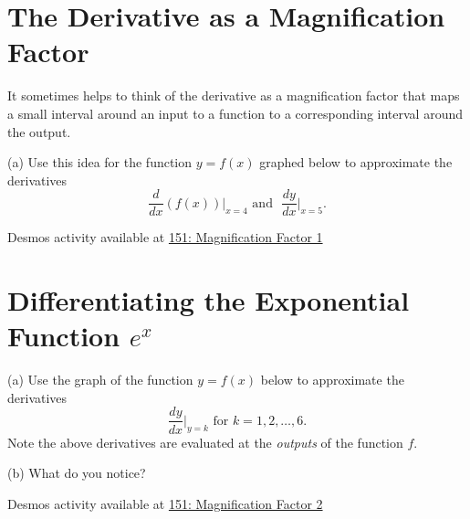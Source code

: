\documentclass{ximera}
\begin{document}
\section*{The Derivative as a Magnification Factor}
\begin{exploration}   \label{Ex:325gyt}

It sometimes helps to think of the derivative as a magnification factor that maps a small interval around an input to a function to a corresponding interval around the output.

(a) Use this idea for the function $y=f(x)$ graphed below to approximate the derivatives 
\[
    \frac{d}{dx} (f(x))\Big|_{x=4} \text{  and  } \,\, \frac{dy}{dx}\Big|_{x=5} .
\]


\begin{onlineOnly}
    \begin{center}
\end{center}
\end{onlineOnly}


Desmos activity available at \href{https://www.desmos.com/calculator/la4f5ots3r}{151: Magnification Factor 1}

\end{exploration}


\section*{Differentiating the Exponential Function $e^x$}

\begin{exploration}

(a) Use the graph of the function $y=f(x)$ below to approximate the derivatives 
\[
    \frac{dy}{dx}\Big|_{y=k} \text{ for } k=1, 2, \ldots , 6.
\]
Note the above derivatives are evaluated at the \emph{outputs} of the function $f$. 

(b) What do  you notice?

\begin{onlineOnly}
    \begin{center}
\end{center}
\end{onlineOnly}


Desmos activity available at \href{https://www.desmos.com/calculator/k08dphtuca}{151: Magnification Factor 2}


\end{exploration}
\end{document}
